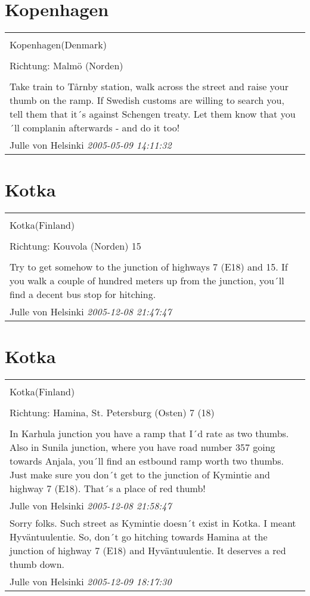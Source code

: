 \documentclass[a4paper,12pt]{article}
\begin{document}
\section{Kopenhagen}
\begin{tabular}{|p{13cm}|}
\hline\\
Kopenhagen(Denmark)\\
\\
Richtung: Malmö (Norden) \\
\hline\\
Take train to Tårnby station, walk across the street and raise your thumb on the ramp. If Swedish customs are willing to search you, tell them that it´s against Schengen treaty. Let them know that you´ll complanin afterwards - and do it too! \\
Julle von Helsinki \textit{ 2005-05-09 14:11:32 }\\\hline
\end{tabular}


\section{Kotka}
\begin{tabular}{|p{13cm}|}
\hline\\
Kotka(Finland)\\
\\
Richtung: Kouvola (Norden) 15 \\
\hline\\
Try to get somehow to the junction of highways 7 (E18) and 15. If you walk a couple of hundred meters up from the junction, you´ll find a decent bus stop for hitching. \\
Julle von Helsinki \textit{ 2005-12-08 21:47:47 }\\\hline
\end{tabular}


\section{Kotka}
\begin{tabular}{|p{13cm}|}
\hline\\
Kotka(Finland)\\
\\
Richtung: Hamina, St. Petersburg (Osten) 7 (18) \\
\hline\\
In Karhula junction you have a ramp that I´d rate as two thumbs.
Also in Sunila junction, where you have road number 357 going towards Anjala, you´ll find an estbound ramp worth two thumbs.
Just make sure you don´t get to the junction of Kymintie and highway 7 (E18). That´s a place of red thumb! \\
Julle von Helsinki \textit{ 2005-12-08 21:58:47 }\\\hline Sorry folks. Such street as Kymintie doesn´t exist in Kotka. I meant Hyväntuulentie. So, don´t go hitching towards Hamina at the junction of highway 7 (E18) and Hyväntuulentie. It deserves a red thumb down. \\
Julle von Helsinki \textit{ 2005-12-09 18:17:30 }\\\hline
\end{tabular}
\end{document}
